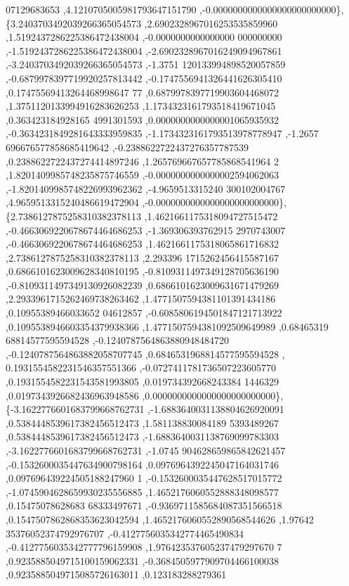 \begin{DoxyCode}
      07129683653 ,4.1210705005981793647151790 ,-0.0000000000000000000000000\},
\{3.2403703492039266365054573 ,2.6902328967016253535859960 ,1.5192437286225386472438004 ,-0.0000000000000000
      000000000 ,-1.5192437286225386472438004 ,-2.6902328967016249094967861 ,-3.2403703492039266365054573 ,-1.3751
      120133994898520057859 ,-0.6879978397719920257813442 ,-0.1747556941326441626305410 ,0.17475569413264468998647
      77 ,0.6879978397719903604468072 ,1.3751120133994916283626253 ,1.1734323161793518419671045 ,0.363423184928165
      4991301593 ,0.0000000000000001065935932 ,-0.3634231849281643333959835 ,-1.1734323161793513978778947 ,-1.2657
      696676577858685419642 ,-0.2388622722437276357787539 ,0.2388622722437274414897246 ,1.265769667657785868541964
      2 ,1.8201409985748235875746559 ,-0.0000000000000002594062063 ,-1.8201409985748226993962362 ,-4.9659513315240
      300102004767 ,4.9659513315240486619472904 ,-0.0000000000000000000000000\},
\{2.7386127875258310382378113 ,1.4621661175318094727515472 ,-0.4663069220678674464686253 ,-1.369306393762915
      2970743007 ,-0.4663069220678674464686253 ,1.4621661175318065861716832 ,2.7386127875258310382378113 ,2.293396
      1715262456415587167 ,0.6866101623009628340810195 ,-0.8109311497349128705636190 ,-0.8109311497349130926082239
       ,0.6866101623009631671479269 ,2.2933961715262469738263462 ,1.4771507594381101391434186 ,0.10955389466033652
      04612857 ,-0.6085806194501847121713922 ,0.1095538946603354379938366 ,1.4771507594381092509649989 ,0.68465319
      68814577595594528 ,-0.1240787564863880948484720 ,-0.1240787564863882058707745 ,0.6846531968814577595594528 ,
      0.1931554582231546357551366 ,-0.0727411781736507223605770 ,0.1931554582231543581993805 ,0.019734392668243384
      1446329 ,0.0197343926682436963948586 ,0.0000000000000000000000000\},
\{-3.1622776601683799668762731 ,-1.6883640031138804626920091 ,0.5384448539617382456512473 ,1.581138830084189
      5393489267 ,0.5384448539617382456512473 ,-1.6883640031138769099783303 ,-3.1622776601683799668762731 ,-1.0745
      904628659865842621457 ,-0.1532600035447634900798164 ,0.0976964392245047164031746 ,0.097696439224505188247960
      1 ,-0.1532600035447628517015772 ,-1.0745904628659930235556885 ,1.4652176060552888348098577 ,0.15475078628683
      68333497671 ,-0.9369711585684087351566518 ,0.1547507862868353623042594 ,1.4652176060552890568544626 ,1.97642
      35376052374792976707 ,-0.4127756035342774465490834 ,-0.4127756035342777796159908 ,1.976423537605237479297670
      7 ,0.9235885049715100159062331 ,-0.3684505977909704466100038 ,0.9235885049715085726163011 ,0.123183288279361

\end{DoxyCode}
